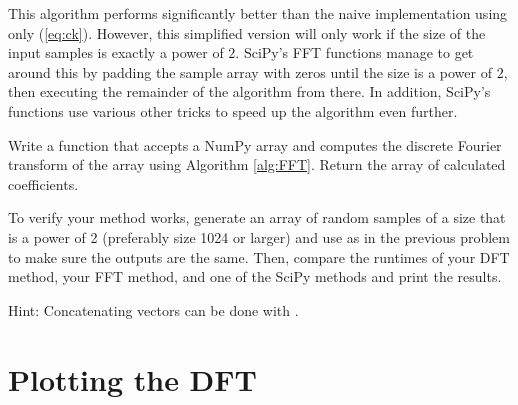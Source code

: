 This algorithm performs significantly better than the naive implementation using only (\ref{eq:ck}).
However, this simplified version will only work if the size of the input samples is exactly a power of $2$.
SciPy's FFT functions manage to get around this by padding the sample array with zeros until the size is a power of $2$, then executing the remainder of the algorithm from there.
In addition, SciPy's functions use various other tricks to speed up the algorithm even further.

\begin{problem}
Write a function that accepts a NumPy array and computes the discrete Fourier transform of the array using Algorithm \ref{alg:FFT}. 
Return the array of calculated coefficients.

To verify your method works, generate an array of random samples of a size that is a power of 2 (preferably size 1024 or larger) and use  as in the previous problem to make sure the outputs are the same.
Then, compare the runtimes of your DFT method, your FFT method, and one of the SciPy methods and print the results.

Hint: Concatenating vectors can be done with .
\end{problem}

\section*{Plotting the DFT} %

